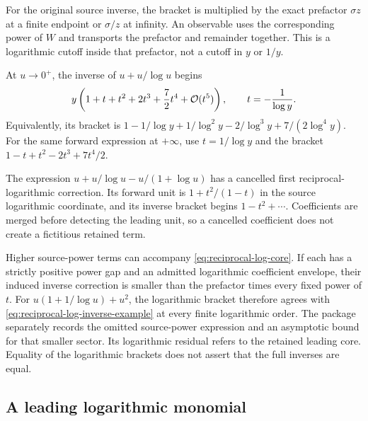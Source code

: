 For the original source inverse, the bracket is multiplied by the exact
prefactor $\sigma z$ at a finite endpoint or $\sigma/z$ at infinity.
An observable uses the corresponding power of $W$ and transports the
prefactor and remainder together. This is a logarithmic cutoff inside
that prefactor, not a cutoff in $y$ or $1/y$.

\begin{example}
At $u\to0^+$, the inverse of $u+u/\log u$ begins
\begin{equation}
 y\left(1+t+t^2+2t^3+\frac72t^4+\mathcal O(t^5)\right),
 \qquad t=-\frac1{\log y}.
 \label{eq:reciprocal-log-inverse-example}
\end{equation}
Equivalently, its bracket is
$1-1/\log y+1/\log^2y-2/\log^3y+7/(2\log^4y)$.
For the same forward expression at $+\infty$, use $t=1/\log y$ and the
bracket $1-t+t^2-2t^3+7t^4/2$.

The expression $u+u/\log u-u/(1+\log u)$ has a cancelled first
reciprocal-logarithmic correction. Its forward unit is
$1+t^2/(1-t)$ in the source logarithmic coordinate, and its inverse bracket
begins $1-t^2+\cdots$. Coefficients are merged before detecting the leading
unit, so a cancelled coefficient does not create a fictitious retained term.
\end{example}

Higher source-power terms can accompany \eqref{eq:reciprocal-log-core}.
If each has a strictly positive power gap and an admitted logarithmic
coefficient envelope, their induced inverse correction is smaller than
the prefactor times every fixed power of $t$. For
$u(1+1/\log u)+u^2$, the logarithmic bracket therefore agrees with
\eqref{eq:reciprocal-log-inverse-example} at every finite logarithmic
order. The package separately records the omitted source-power expression
and an asymptotic bound for that smaller sector. Its logarithmic residual
refers to the retained leading core. Equality of the logarithmic brackets
does not assert that the full inverses are equal.

\subsection{A leading logarithmic monomial}

